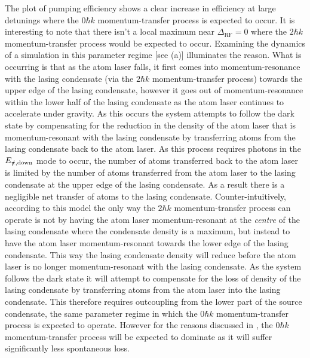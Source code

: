 The plot of pumping efficiency  shows a clear increase in efficiency at large detunings where the $0 \hbar k$ momentum-transfer process is expected to occur.  It is interesting to note that there isn't a local maximum near $\Delta_\text{RF} = 0$ where the $2 \hbar k$ momentum-transfer process would be expected to occur.  Examining the dynamics of a simulation in this parameter regime [see (a)] illuminates the reason.  What is occurring is that as the atom laser falls, it first comes into momentum-resonance with the lasing condensate (via the $2 \hbar k$ momentum-transfer process) towards the upper edge of the lasing condensate, however it goes out of momentum-resonance within the lower half of the lasing condensate as the atom laser continues to accelerate under gravity.  As this occurs the system attempts to follow the dark state by compensating for the reduction in the density of the atom laser that is momentum-resonant with the lasing condensate by transferring atoms from the lasing condensate back to the atom laser.  As this process requires photons in the $E_{\slashed{\pi}, \text{down}}$ mode to occur, the number of atoms transferred back to the atom laser is limited by the number of atoms transferred from the atom laser to the lasing condensate at the upper edge of the lasing condensate.  As a result there is a negligible net transfer of atoms to the lasing condensate.  Counter-intuitively, according to this model the only way the $2 \hbar k$ momentum-transfer process can operate is not by having the atom laser momentum-resonant at the \emph{centre} of the lasing condensate where the condensate density is a maximum, but instead to have the atom laser momentum-resonant towards the lower edge of the lasing condensate.  This way the lasing condensate density will reduce before the atom laser is no longer momentum-resonant with the lasing condensate.  As the system follows the dark state it will attempt to compensate for the loss of density of the lasing condensate by transferring atoms from the atom laser into the lasing condensate.  This therefore requires outcoupling from the lower part of the source condensate, the same parameter regime in which the $0 \hbar k$ momentum-transfer process is expected to operate.  However for the reasons discussed in , the $0 \hbar k$ momentum-transfer process will be expected to dominate as it will suffer significantly less spontaneous loss.

